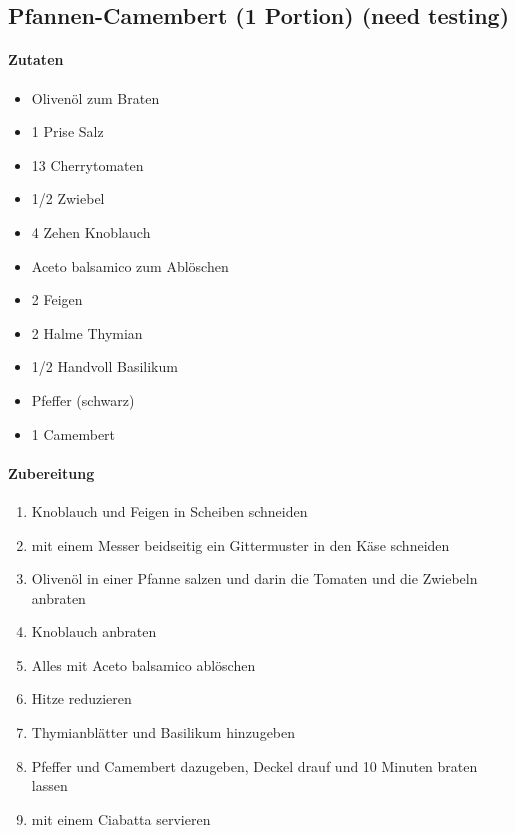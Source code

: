 \newpage
\subsection{Pfannen-Camembert (1 Portion) (need testing)}
\paragraph{Zutaten}
\begin{itemize}[noitemsep]
	\item Olivenöl zum Braten
	\item 1 Prise Salz
	\item 13 Cherrytomaten
	\item 1/2 Zwiebel 
	\item 4 Zehen Knoblauch
	\item Aceto balsamico zum Ablöschen
	\item 2 Feigen
	\item 2 Halme Thymian
	\item 1/2 Handvoll Basilikum
	\item Pfeffer (schwarz)
	\item 1 Camembert
\end{itemize}
\paragraph{Zubereitung}
\begin{enumerate}[noitemsep]
	\item Knoblauch und Feigen in Scheiben schneiden
	\item mit einem Messer beidseitig ein Gittermuster in den Käse schneiden
	\item Olivenöl in einer Pfanne salzen und darin die Tomaten und die Zwiebeln anbraten
	\item Knoblauch anbraten
	\item Alles mit Aceto balsamico ablöschen
	\item Hitze reduzieren 
	\item Thymianblätter und Basilikum hinzugeben
	\item Pfeffer und Camembert dazugeben, Deckel drauf und 10 Minuten braten lassen
	\item mit einem Ciabatta servieren
\end{enumerate}
